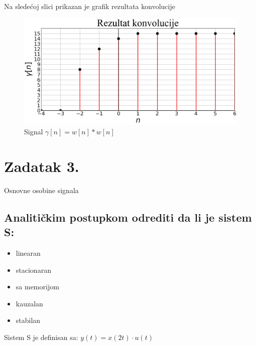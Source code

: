 \documentclass[titlepage,a4paper,12pt]{article}
\begin{document}
	\clearpage
	\noindent Na sledećoj slici prikazan je grafik rezultata konvolucije
	\begin{figure}[ht]
		\centering
		\includegraphics[width=\textwidth]{Images/zadatak2pic3.png}
		\caption{Signal $\gamma[n] = w[n] * w[n]$}\label{fig:slika7}
	\end{figure}
	\FloatBarrier
	
	\clearpage
	
	\section{Zadatak 3.}
	\Large{Osnovne osobine signala}
	\normalsize{}
	
	\subsection[Prvi deo]{Analitičkim postupkom odrediti da li je sistem S:}
	\begin{itemize}[noitemsep, partopsep=0pt,itemindent=20pt]
		\item linearan
		\item stacionaran
		\item sa memorijom
		\item kauzalan
		\item stabilan
	\end{itemize}
	\indent \large{Sistem S je definisan sa: $y(t) = x(2t)\cdot u(t)$}\\
	
\end{document}
